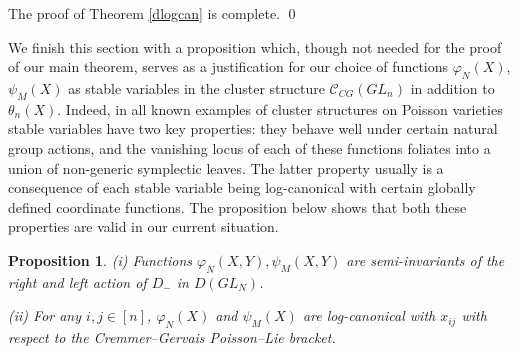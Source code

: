 \documentclass{amsart}
\newtheorem{proposition}[theorem]{Proposition}
\theoremstyle{definition}
\theoremstyle{remark}
\numberwithin{equation}{section}
\numberwithin{theorem}{section}
\begin{document}
The proof of Theorem \ref{dlogcan} is complete.
\qed

We finish this section with a proposition which, though not needed for the proof of our main theorem,
 serves as a justification for our choice of functions ${{\varphi}}_N(X)$, ${{\psi}}_M(X)$ as stable 
variables in the cluster structure ${{\mathcal C}}_{CG}(GL_n)$ in addition to ${{\theta}}_n(X)$. Indeed, in all known examples of cluster structures on Poisson varieties stable variables have two key properties: they behave well under certain
natural group actions, and the vanishing locus of each of these functions foliates into a union of non-generic symplectic
leaves. The latter property usually is a consequence of each stable variable being log-canonical with certain globally defined
 coordinate functions. The proposition below shows that both these properties are valid in our current situation.

\begin{proposition}
\label{sigizmund}
{\rm(i)}  
Functions ${{\varphi}}_N(X,Y), {{\psi}}_M(X,Y)$ are semi-invariants of the right and left action of $D_-$ in $D(GL_N)$.

{\rm(ii)}  
For any $i,j\in [n]$, ${{\varphi}}_N(X)$ and ${{\psi}}_M(X)$ are log-canonical with $x_{ij}$ with respect to  
the Cremmer--Gervais Poisson--Lie bracket.
\end{proposition}
\end{document}
